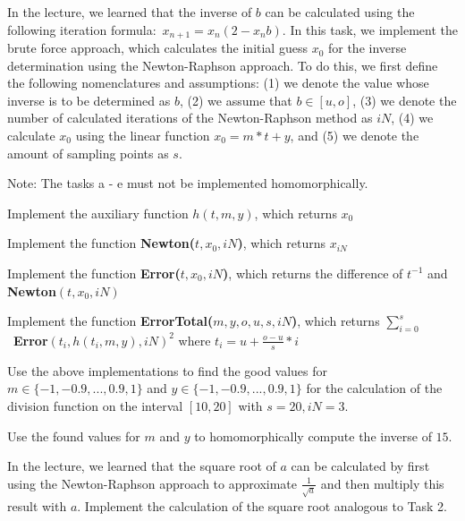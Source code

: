 \begin{aufgabe}

In the lecture, we learned that the inverse of $b$ can be calculated using the following iteration formula:~$x_{n+1} = x_n (2 - x_n b)$. In this task, we implement the brute force approach, which calculates the initial guess $x_0$ for the inverse determination using the Newton-Raphson approach.
To do this, we first define the following nomenclatures and assumptions:
(1) we denote the value whose inverse is to be determined as $b$, 
(2) we assume that $b \in [u,o]$, 
(3) we denote the number of calculated iterations of the Newton-Raphson method as $iN$, 
(4) we calculate $x_0$ using the linear function $x_0=m*t+y$, and (5) we denote the amount of sampling points as $s$.

Note: The tasks a - e must not be implemented homomorphically.

\begin{teilaufgabe}

\item Implement the auxiliary function $h(t,m,y)$, which returns $x_0$
\item Implement the function \textbf{Newton($t,x_0,iN$)}, which returns $x_{iN}$
\item Implement the function \textbf{Error($t,x_0,iN$)}, which returns the difference of $t^{-1}$ and \textbf{Newton$(t,x_0,iN)$}   
\item Implement the function \textbf{ErrorTotal($m,y,o,u,s,iN$)}, which returns $\sum_{i=0}^{s}$~\textbf{Error$(t_i,h(t_i,m,y),iN)^2$} where $t_i= u + \frac{o-u}{s} * i$
\item Use the above implementations to find the good values for $m \in \{-1,-0.9,...,0.9,1\}$ and $y \in \{-1,-0.9,...,0.9,1\}$ for the calculation of the division function on the interval $[10, 20]$ with $s = 20, iN = 3$. 
\item Use the found values for $m$ and $y$ to homomorphically compute the inverse of $15$.
\end{teilaufgabe}

\end{aufgabe}




\begin{aufgabe}
In the lecture, we learned that the square root of $a$ can be calculated by first using the Newton-Raphson approach to approximate $\frac{1}{\sqrt{a}}$ and then multiply this result with $a$. Implement the calculation of the square root analogous to Task 2.
\end{aufgabe}
